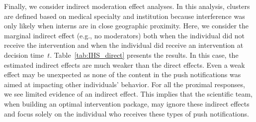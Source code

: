 \documentclass[lineno]{biometrika}
\begin{document}
Finally, we consider indirect moderation effect analyses.   In this analysis, clusters are defined based on medical specialty and institution because interference was only likely when interns are in close geographic proximity.   Here, we consider the marginal indirect effect (e.g., no moderators) both when the individual did not receive the intervention and when the individual did receive an intervention at decision time~$t$.  Table~\ref{tab:IHS_direct} presents the results.  In this case, the estimated indirect effects are much weaker than the direct effects.  Even a weak effect may be unexpected as none of the content in the push notifications was aimed at impacting other individuals' behavior.  For all the proximal responses, we see limited evidence of an indirect effect.  This implies that the scientific team, when building an optimal intervention package, may ignore these indirect effects and focus solely on the individual who receives these types of push notifications.
\end{document}

